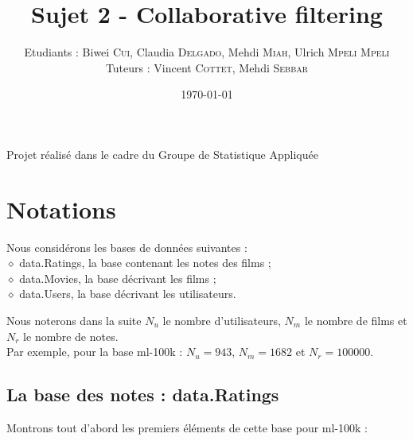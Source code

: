\documentclass[a4paper, 11pt]{article}
\newenvironment{bottompar}{\par\vspace*{\fill}}{\clearpage}
\begin{document}
\title{Sujet 2 - Collaborative filtering}
\author{
Etudiants : Biwei \textsc{Cui}, Claudia \textsc{Delgado}, Mehdi \textsc{Miah}, Ulrich \textsc{Mpeli Mpeli} \\
Tuteurs : Vincent \textsc{Cottet}, Mehdi  \textsc{Sebbar}
}

\date{\today}
\maketitle

\tableofcontents
\newpage

\begin{bottompar}
Projet réalisé dans le cadre du Groupe de Statistique Appliquée
\end{bottompar}

\newpage

\section{Notations}

Nous considérons les bases de données suivantes : \\
$\diamond$ data.Ratings, la base contenant les notes des films ; \\
$\diamond$ data.Movies, la base décrivant les films ; \\
$\diamond$ data.Users, la base décrivant les utilisateurs. 

Nous noterons dans la suite $N_u$ le nombre d'utilisateurs, $N_m$ le nombre de films et $N_r$ le nombre de notes. \\
Par exemple, pour la base ml-100k : $N_u = 943$, $N_m = 1682$ et $N_r = 100000$.

\subsection{La base des notes : data.Ratings}

Montrons tout d'abord les premiers éléments de cette base pour ml-100k : 
\end{document}
